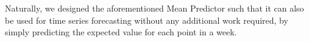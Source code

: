 Naturally, we designed the aforementioned Mean Predictor such that it can also be used for time series forecasting without any additional work required, by simply predicting the expected value for each point in a week.